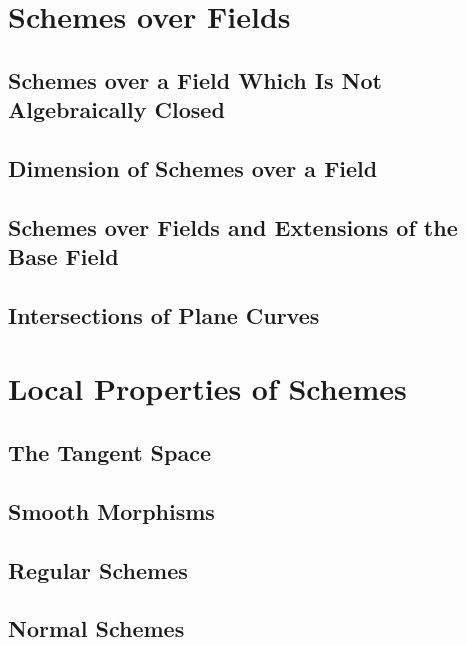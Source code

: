 \documentclass[11pt, a4paper]{article}
\begin{document}
\section{Schemes over Fields}

\subsection{Schemes over a Field Which Is Not Algebraically Closed}

\subsection{Dimension of Schemes over a Field}

\subsection{Schemes over Fields and Extensions of the Base Field}

\subsection{Intersections of Plane Curves}

\section{Local Properties of Schemes}

\subsection{The Tangent Space}

\subsection{Smooth Morphisms}

\subsection{Regular Schemes}

\subsection{Normal Schemes}
\end{document}
